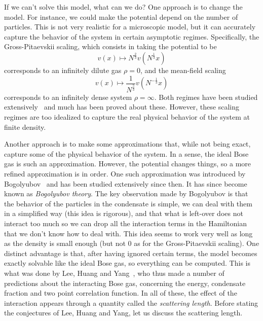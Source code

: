 \documentclass{ian}
\begin{document}
\indent
If we can't solve this model, what can we do?
One approach is to change the model.
For instance, we could make the potential depend on the number of particles.
This is not very realistic for a microscopic model, but it can accurately capture the behavior of the system in certain asymptotic regimes.
Specifically, the Gross-Pitaevskii scaling, which consists in taking the potential to be
\begin{equation}
  v(x)\mapsto N^{\frac23}v(N^{\frac13}x)
\end{equation}
corresponds to an infinitely dilute gas $\rho=0$, and the mean-field scaling
\begin{equation}
  v(x)\mapsto \frac1{N^{\frac53}}v(N^{-\frac13}x)
\end{equation}
corresponds to an infinitely dense system $\rho=\infty$.
Both regimes have been studied extensively\-~\cite{Sc22,Se11} and much has been proved about these.
However, these scaling regimes are too idealized to capture the real physical behavior of the system at finite density.
\bigskip

\indent
Another approach is to make some approximations that, while not being exact, capture some of the physical behavior of the system.
In a sense, the ideal Bose gas is such an approximation.
However, the potential changes things, so a more refined approximation is in order.
One such approximation was introduced by Bogolyubov\-~\cite{Bo47} and has been studied extensively since then.
It has since become known as {\it Bogolyubov theory}.
The key observation made by Bogolyubov is that the behavior of the particles in the condensate is simple, we can deal with them in a simplified way (this idea is rigorous), and that what is left-over does not interact too much so we can drop all the interaction terms in the Hamiltonian that we don't know how to deal with.
This idea seems to work very well as long as the density is small enough (but not $0$ as for the Gross-Pitaevskii scaling).
One distinct advantage is that, after having ignored certain terms, the model becomes exactly solvable like the ideal Bose gas, so everything can be computed.
This is what was done by Lee, Huang and Yang\-~\cite{LHY57}, who thus made a number of predictions about the interacting Bose gas, concerning the energy, condensate fraction and two point correlation function.
In all of these, the effect of the interaction appears through a quantity called the {\it scattering length}.
Before stating the conjectures of Lee, Huang and Yang, let us discuss the scattering length.
\end{document}

